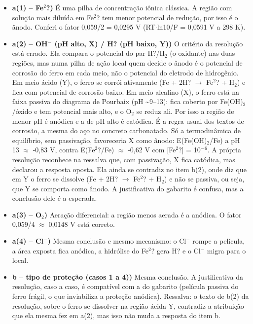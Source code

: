 \documentclass{article}%
\begin{document}
\begin{itemize}%
\item%
\textbf{a(1) -- Fe$^2$?)} É uma pilha de concentração iônica clássica. A região com solução mais diluída em Fe$^2$? tem menor potencial de redução, por isso é o ânodo. Conferi o fator 0,059/2 = 0,0295 V (RT$\cdot$ln10/F = 0,0591 V a 298 K).%
\item%
\textbf{a(2) -- OH$^{-}$ (pH alto, X) / H? (pH baixo, Y))} O critério da resolução está errado. Ela compara o potencial do par H?/H$_{2}$ (o oxidante) nas duas regiões, mas numa pilha de ação local quem decide o ânodo é o potencial de corrosão do ferro em cada meio, não o potencial do eletrodo de hidrogênio. Em meio ácido (Y), o ferro se corrói ativamente (Fe + 2H? $\to$ Fe$^2$? + H$_{2}$) e fica com potencial de corrosão baixo. Em meio alcalino (X), o ferro está na faixa passiva do diagrama de Pourbaix (pH \textasciitilde{}9--13): fica coberto por Fe(OH)$_{2}$/óxido e tem potencial mais alto, e o O$_{2}$ se reduz ali. Por isso a região de menor pH é anódica e a de pH alto é catódica. É a regra usual dos textos de corrosão, a mesma do aço no concreto carbonatado. Só a termodinâmica de equilíbrio, sem passivação, favoreceria X como ânodo: E(Fe(OH)$_{2}$/Fe) a pH 13 $\approx$ -0,83 V, contra E(Fe$^2$?/Fe) $\approx$ -0,62 V com {[}Fe$^2$?{]} = 10$^{-}$$^{6}$. A própria resolução reconhece na ressalva que, com passivação, X fica catódica, mas declarou a resposta oposta. Ela ainda se contradiz no item b(2), onde diz que em Y o ferro se dissolve (Fe + 2H? $\to$ Fe$^2$? + H$_{2}$) e não se passiva, ou seja, que Y se comporta como ânodo. A justificativa do gabarito é confusa, mas a conclusão dele é a esperada.%
\item%
\textbf{a(3) -- O$_{2}$)} Aeração diferencial: a região menos aerada é a anódica. O fator 0,059/4 $\approx$ 0,0148 V está correto.%
\item%
\textbf{a(4) -- Cl$^{-}$)} Mesma conclusão e mesmo mecanismo: o Cl$^{-}$ rompe a película, a área exposta fica anódica, a hidrólise do Fe$^2$? gera H? e o Cl$^{-}$ migra para o local.%
\item%
\textbf{b -- tipo de proteção (casos 1 a 4))} Mesma conclusão. A justificativa da resolução, caso a caso, é compatível com a do gabarito (película passiva do ferro frágil, o que inviabiliza a proteção anódica). Ressalva: o texto de b(2) da resolução, sobre o ferro se dissolver na região ácida Y, contradiz a atribuição que ela mesma fez em a(2), mas isso não muda a resposta do item b.%
\end{itemize}%
\end{document}
